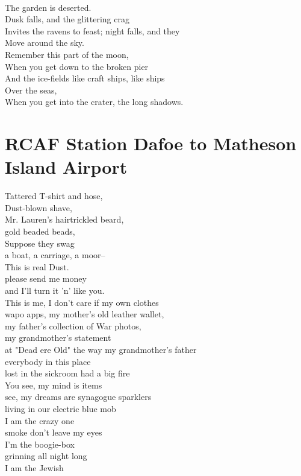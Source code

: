 \documentclass[smalldemyvopaper,11pt,twoside,onecolumn,openright,extrafontsizes]{memoir}
\begin{document}
\\The garden is deserted.
\\Dusk falls, and the glittering crag
\\Invites the ravens to feast; night falls, and they
\\Move around the sky.
\\Remember this part of the moon,
\\When you get down to the broken pier
\\And the ice-fields like craft ships, like ships
\\Over the seas,
\\When you get into the crater, the long shadows.



\chapter{RCAF Station Dafoe to Matheson Island Airport}
Tattered T-shirt and hose,
\\Dust-blown shave,
\\Mr. Lauren's hairtrickled beard,
\\gold beaded beads,
\\Suppose they swag
\\a boat, a carriage, a moor--
\\This is real Dust.
\\please send me money
\\and I'll turn it 'n' like you.
\\This is me, I don't care if my own clothes
\\wapo apps, my mother's old leather wallet,
\\my father's collection of War photos,
\\my grandmother's statement
\\at "Dead ere Old" the way my grandmother's father
\\everybody in this place
\\lost in the sickroom had a big fire
\\You see, my mind is items
\\see, my dreams are synagogue sparklers
\\living in our electric blue mob
\\I am the crazy one
\\smoke don't leave my eyes
\\I'm the boogie-box
\\grinning all night long
\\I am the Jewish
\end{document}

